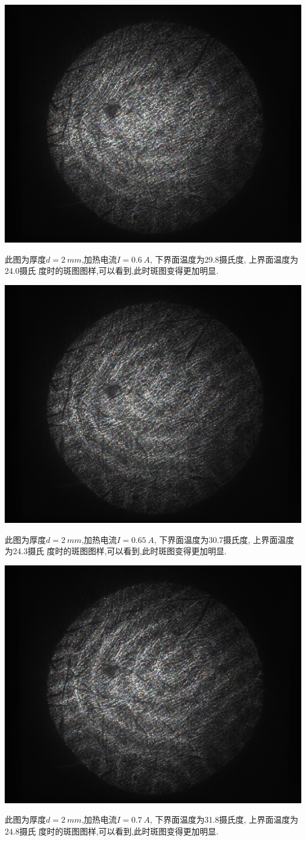 \documentclass[aps,pre,12pt,preprint,onecolumn,showpacs,showkeys,floatfix]{revtex4-1}
\begin{document}
\begin{center}
    \includegraphics[width=.5\textwidth]{5.20/3.pdf}
\end{center}
    此图为厚度$d=\SI{2}{mm}$,加热电流$I=\SI{0.6}{A}$, 下界面温度为29.8摄氏度, 上界面温度为24.0摄氏
    度时的斑图图样,可以看到,此时斑图变得更加明显.

\begin{center}
    \includegraphics[width=.5\textwidth]{5.20/4.pdf}
\end{center}
    此图为厚度$d=\SI{2}{mm}$,加热电流$I=\SI{0.65}{A}$, 下界面温度为30.7摄氏度, 上界面温度为24.3摄氏
    度时的斑图图样,可以看到,此时斑图变得更加明显.

\begin{center}
    \includegraphics[width=.5\textwidth]{5.20/5.pdf}
\end{center}
    此图为厚度$d=\SI{2}{mm}$,加热电流$I=\SI{0.7}{A}$, 下界面温度为31.8摄氏度, 上界面温度为24.8摄氏
    度时的斑图图样,可以看到,此时斑图变得更加明显.
\end{document}
